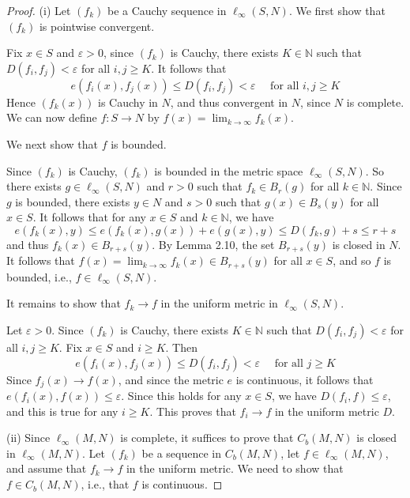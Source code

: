 \documentclass[a4paper,11pt]{article}
\begin{document}
\begin{proof}
    (i) Let $\left(f_k\right)$ be a Cauchy sequence in $\ell_{\infty}(S, N)$. We first show that $\left(f_k\right)$ is pointwise convergent. 
    
    Fix $x \in S$ and $\varepsilon>0$, since $\left(f_k\right)$ is Cauchy, there exists $K \in \mathbb{N}$ such that $D\left(f_i, f_j\right)<\varepsilon$ for all $i, j \geqslant K$. It follows that
    \[
    e\left(f_i(x), f_j(x)\right) \leqslant D\left(f_i, f_j\right)<\varepsilon \quad \text { for all } i, j \geqslant K
    \]
    Hence $\left(f_k(x)\right)$ is Cauchy in $N$, and thus convergent in $N$, since $N$ is complete. We can now define $ f: S \rightarrow N \text { by } f(x)=\lim _{k \rightarrow \infty} f_k(x) $.

    We next show that $f$ is bounded. 
    
    Since $ (f_k)$ is Cauchy, $\left(f_k\right)$ is bounded in the metric space $\ell_{\infty}(S, N)$. So there exists $g \in \ell_{\infty}(S, N)$ and $r>0$ such that $f_k \in B_r(g)$ for all $k \in \mathbb{N}$. Since $g$ is bounded, there exists $y \in N$ and $s>0$ such that $g(x) \in B_s(y)$ for all $x \in S$. It follows that for any $x \in S$ and $k \in \mathbb{N}$, we have
    \[
    e\left(f_k(x), y\right) \leqslant e\left(f_k(x), g(x)\right)+e(g(x), y) \leqslant D\left(f_k, g\right)+s \leqslant r+s
    \]
    and thus $f_k(x) \in B_{r+s}(y)$. By Lemma 2.10, the set $B_{r+s}(y)$ is closed in $N$. It follows that $f(x)=\lim _{k \rightarrow \infty} f_k(x) \in B_{r+s}(y)$ for all $x \in S$, and so $f$ is bounded, i.e., $f \in \ell_{\infty}(S, N)$.

    It remains to show that $f_k \rightarrow f$ in the uniform metric in $\ell_{\infty}(S, N)$. 
    
    Let $\varepsilon>0$. Since $\left(f_k\right)$ is Cauchy, there exists $K \in \mathbb{N}$ such that $D\left(f_i, f_j\right)<\varepsilon$ for all $i, j \geqslant K$. Fix $x \in S$ and $i \geqslant K$. Then
    \[
    e\left(f_i(x), f_j(x)\right) \leqslant D\left(f_i, f_j\right)<\varepsilon \quad \text { for all } j \geqslant K
    \]
    Since $f_j(x) \rightarrow f(x)$, and since the metric $e$ is continuous, it follows that $e\left(f_i(x), f(x)\right) \leqslant \varepsilon$. Since this holds for any $x \in S$, we have $D\left(f_i, f\right) \leqslant \varepsilon$, and this is true for any $i \geqslant K$. This proves that $f_i \rightarrow f$ in the uniform metric $D$.
    
    (ii) Since $\ell_{\infty}(M, N)$ is complete, it suffices to prove that $C_b(M, N)$ is closed in $\ell_{\infty}(M, N)$. Let $\left(f_k\right)$ be a sequence in $C_b(M, N)$, let $f \in \ell_{\infty}(M, N)$, and assume that $f_k \rightarrow f$ in the uniform metric. We need to show that $f \in C_b(M, N)$, i.e., that $f$ is continuous.


\end{proof}
\end{document}
